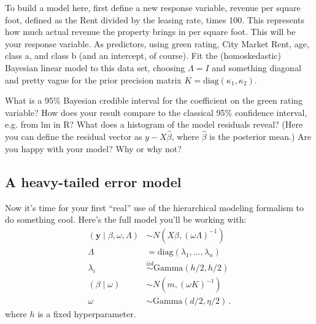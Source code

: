 \documentclass{mynotes}
\newcommand{\by}{\textbf{y}}
\begin{document}
To build a model here, first define a new response variable, revenue per square foot, defined as the Rent divided by the leasing rate, times 100.  This represents how much actual revenue the property brings in per square foot.  This will be your response variable.  As predictors, using green rating, City Market Rent, age, class a, and class b (and an intercept, of course).  Fit the (homoskedastic) Bayesian linear model to this data set, choosing $\Lambda = I$ and something diagonal and pretty vague for the prior precision matrix $K = \mbox{diag}(\kappa_1, \kappa_2)$.

What is a 95\% Bayesian credible interval for the coefficient on the green rating variable?  How does your result compare to the classical 95\% confidence interval, e.g. from lm in R?  What does a histogram of the model residuals reveal?  (Here you can define the residual vector as $y - X \hat{\beta}$, where $\hat{\beta}$ is the posterior mean.)  Are you happy with your model?  Why or why not?  




\subsection{A heavy-tailed error model}


Now it's time for your first ``real'' use of the hierarchical modeling formalism to do something cool.  Here's the full model you'll be working with:
\begin{align}
(\by \mid \beta, \omega, \Lambda) &\sim N(X \beta, (\omega \Lambda)^{-1}) \\
\Lambda &= \mbox{diag}(\lambda_1, \ldots, \lambda_n) \\
\lambda_i &\stackrel{iid}{\sim} \mbox{Gamma}(h/2, h/2) \\
(\beta \mid \omega) &\sim N(m, (\omega K)^{-1}) \\
\omega &\sim \mbox{Gamma}(d/2, \eta/2) \, .
\end{align}
where $h$ is a fixed hyperparameter.
\end{document}

